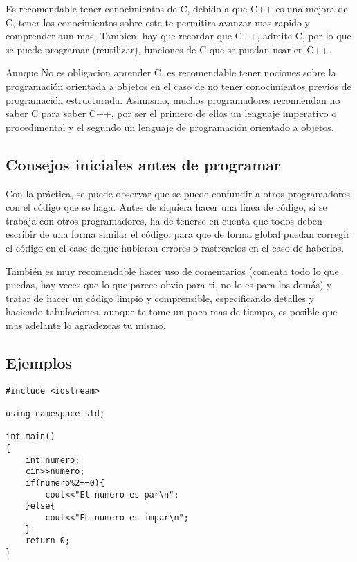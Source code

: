 Es recomendable tener conocimientos de C, debido a que C++ es una mejora de C, tener los conocimientos sobre este te permitira avanzar mas rapido y comprender aun mas. Tambien, hay que recordar que C++, admite C, por lo que se puede programar (reutilizar), funciones de C que se puedan usar en C++.

Aunque No es obligacion aprender C, es recomendable tener nociones sobre la programación orientada a objetos en el caso de no tener conocimientos previos de programación estructurada. Asimismo, muchos programadores recomiendan no saber C para saber C++, por ser el primero de ellos un lenguaje imperativo o procedimental y el segundo un lenguaje de programación orientado a objetos.

\subsection{Consejos iniciales antes de programar}

Con la práctica, se puede observar que se puede confundir a otros programadores con el código que se haga. Antes de siquiera hacer una línea de código, si se trabaja con otros programadores, ha de tenerse en cuenta que todos deben escribir de una forma similar el código, para que de forma global puedan corregir el código en el caso de que hubieran errores o rastrearlos en el caso de haberlos.

También es muy recomendable hacer uso de comentarios (comenta todo lo que puedas, hay veces que lo que parece obvio para ti, no lo es para los demás) y tratar de hacer un código limpio y comprensible, especificando detalles y haciendo tabulaciones, aunque te tome un poco mas de tiempo, es posible que mas adelante lo agradezcas tu mismo.

\subsection{Ejemplos}

\begin{lstlisting}[style=Cpp,label=ejemplo-c++,caption=Ejemplo de C++]
#include <iostream>

using namespace std;

int main()
{
    int numero;
    cin>>numero;
    if(numero%2==0){
        cout<<"El numero es par\n";
    }else{
        cout<<"EL numero es impar\n";
    }
    return 0;
}
\end{lstlisting}


